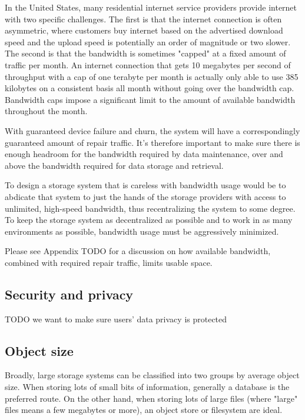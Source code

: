 \documentclass[a4paper,10pt]{article}
\newcommand{\todo}[1]{{\color{red} TODO #1}}
\begin{document}
In the United States, many residential internet service providers provide
internet with two specific challenges. The first is that the internet connection
is often asymmetric, where customers buy internet based on the advertised
download speed and the upload speed is potentially an order of magnitude or
two slower. The second is that the bandwidth is sometimes "capped" at a fixed
amount of traffic per month. An internet connection that gets 10 megabytes per
second of throughput with a cap of one terabyte per month is actually only able
to use 385 kilobytes on a consistent basis all month without going over the
bandwidth cap. Bandwidth caps impose a significant limit to the amount of
available bandwidth throughout the month.

With guaranteed device failure and churn, the system will have a correspondingly
guaranteed amount of repair traffic. It's therefore important to make sure there
is enough headroom for the bandwidth required by data maintenance, over and
above the bandwidth required for data storage and retrieval.

To design a storage system that is careless with bandwidth usage would be to
abdicate that system to just the hands of the storage providers with access to
unlimited, high-speed bandwidth, thus recentralizing the system to some degree.
To keep the storage system as decentralized as possible and to work in as many
environments as possible, bandwidth usage must be aggressively minimized.

Please see Appendix \todo{} for a discussion on how available bandwidth,
combined with required repair traffic, limits usable space.

\subsection{Security and privacy}

\todo{we want to make sure users' data privacy is protected}

\subsection{Object size}

Broadly, large storage systems can be classified into two groups by average
object size. When storing lots of small bits of information, generally a
database is the preferred route. On the other hand, when storing lots of large
files (where "large" files means a few megabytes or more), an object store or
filesystem are ideal.
\end{document}
